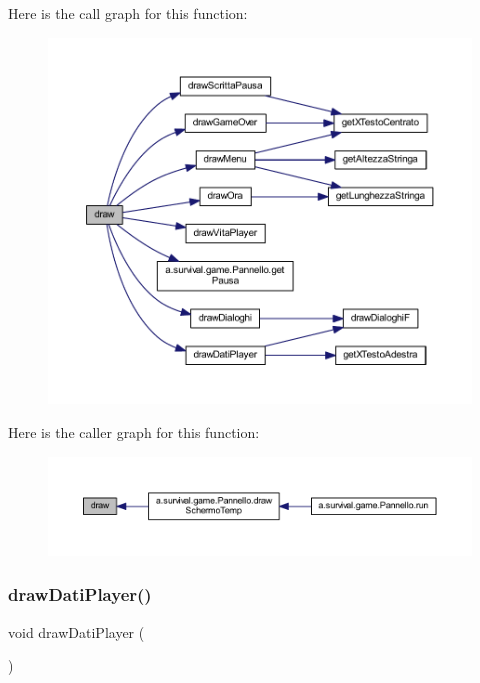 Here is the call graph for this function\+:
\nopagebreak
\begin{figure}[H]
\begin{center}
\leavevmode
\includegraphics[width=350pt]{classa_1_1survival_1_1game_1_1_interfaccia_ae8c972c0fb4fcbc09c2219dd32cbd053_cgraph}
\end{center}
\end{figure}
Here is the caller graph for this function\+:
\nopagebreak
\begin{figure}[H]
\begin{center}
\leavevmode
\includegraphics[width=350pt]{classa_1_1survival_1_1game_1_1_interfaccia_ae8c972c0fb4fcbc09c2219dd32cbd053_icgraph}
\end{center}
\end{figure}
\mbox{\label{classa_1_1survival_1_1game_1_1_interfaccia_aa9a8046a21bf4083e12263a078701107}} 
\subsubsection{\texorpdfstring{draw\+Dati\+Player()}{drawDatiPlayer()}}
{\footnotesize\ttfamily void draw\+Dati\+Player (\begin{DoxyParamCaption}{ }\end{DoxyParamCaption})}



